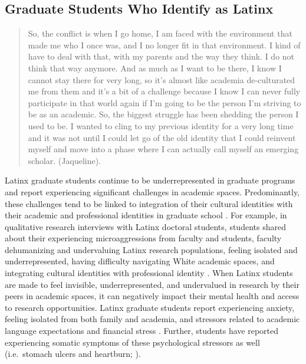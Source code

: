 \documentclass[
  11pt,
]{book}
\begin{document}
\subsection{Graduate Students Who Identify as Latinx}\label{graduate-students-who-identify-as-latinx}

\begin{quote}
So, the conflict is when I go home, I am faced with the environment that made me who I once was, and I no longer fit in that environment. I kind of have to deal with that, with my parents and the way they think. I do not think that way anymore. And as much as I want to be there, I know I cannot stay there for very long, so it's almost like academia de-culturated me from them and it's a bit of a challenge because I know I can never fully participate in that world again if I'm going to be the person I'm striving to be as an academic. So, the biggest struggle has been shedding the person I used to be. I wanted to cling to my previous identity for a very long time and it was not until I could let go of the old identity that I could reinvent myself and move into a phase where I can actually call myself an emerging scholar. (Jaqueline). \citep[383]{ramos_conociendo_2020}
\end{quote}

Latinx graduate students continue to be underrepresented in graduate programs and report experiencing significant challenges in academic spaces. Predominantly, these challenges tend to be linked to integration of their cultural identities with their academic and professional identities in graduate school \citep{crumb_fostering_2022, locke_counterstory_2022, ramos_conociendo_2020}. For example, in qualitative research interviews with Latinx doctoral students, students shared about their experiencing microaggressions from faculty and students, faculty dehumanizing and undervaluing Latinx research populations, feeling isolated and underrepresented, having difficulty navigating White academic spaces, and integrating cultural identities with professional identity \citep{crumb_fostering_2022, ramos_conociendo_2020}. When Latinx students are made to feel invisible, underrepresented, and undervalued in research by their peers in academic spaces, it can negatively impact their mental health and access to research opportunities. Latinx graduate students report experiencing anxiety, feeling isolated from both family and academia, and stressors related to academic language expectations and financial stress \citep{crumb_fostering_2022, locke_counterstory_2022, ramos_conociendo_2020}. Further, students have reported experiencing somatic symptoms of these psychological stressors as well (i.e.~stomach ulcers and heartburn; \citet{ramos_conociendo_2020}).
\end{document}
